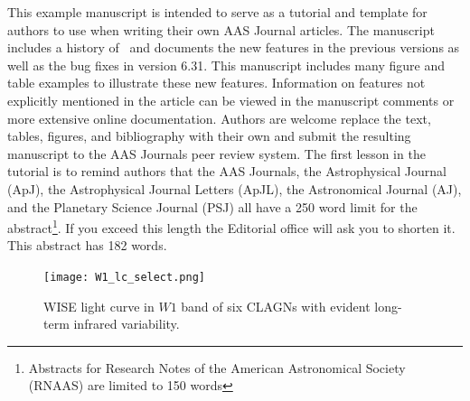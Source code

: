 \usepackage{graphicx}	%
\usepackage{amsmath}	%
\usepackage{amssymb}	%
\usepackage{multicol}
\usepackage{multirow}
\usepackage{pdflscape}	%
\usepackage{amsmath} %
\newcommand{\angstrom}{\text{\normalfont\AA}}
\usepackage{color}
\usepackage{times}
\usepackage{cleveref}
\usepackage{hyperref}
\usepackage{comment}
\usepackage{url}

This example manuscript is intended to serve as a tutorial and template for
authors to use when writing their own AAS Journal articles. The manuscript
includes a history of \aastex\ and documents the new features in the
previous versions as well as the bug fixes in version 6.31. This
manuscript includes many figure and table examples to illustrate these new
features.  Information on features not explicitly mentioned in the article
can be viewed in the manuscript comments or more extensive online
documentation. Authors are welcome replace the text, tables, figures, and
bibliography with their own and submit the resulting manuscript to the AAS
Journals peer review system.  The first lesson in the tutorial is to remind
authors that the AAS Journals, the Astrophysical Journal (ApJ), the
Astrophysical Journal Letters (ApJL), the Astronomical Journal (AJ), and
the Planetary Science Journal (PSJ) all have a 250 word limit for the 
abstract\footnote{Abstracts for Research Notes of the American Astronomical 
Society (RNAAS) are limited to 150 words}.  If you exceed this length the
Editorial office will ask you to shorten it. This abstract has 182 words.


\begin{figure}
\centering
	\texttt{[image: W1\_lc\_select.png]}
    \caption{WISE light curve in $W1$ band of six CLAGNs with evident long-term infrared variability. }
    \label{fig:W1_lc}
\end{figure}




